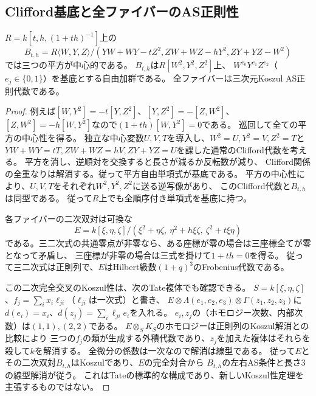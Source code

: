 \subsection{Clifford基底と全ファイバーのAS正則性}
\begin{lemma}\label{lem:ternary-clifford}
$R=k[t,h,(1+th)^{-1}]$上の
\[
 B_{t,h}=R\langle W,Y,Z\rangle/(YW+WY-tZ^2,ZW+WZ-hY^2,ZY+YZ-W^2)
\]
では三つの平方が中心的である。
$B_{t,h}$は$R[W^2,Y^2,Z^2]$上、
$W^{e_0}Y^{e_1}Z^{e_2}$（$e_j\in\{0,1\}$）を基底とする自由加群である。
全ファイバーは三次元Koszul AS正則代数である。
\end{lemma}
\begin{proof}
例えば$[W,Y^2]=-t[Y,Z^2]$、$[Y,Z^2]=-[Z,W^2]$、
$[Z,W^2]=-h[W,Y^2]$なので$(1+th)[W,Y^2]=0$である。
巡回して全ての平方の中心性を得る。
独立な中心変数$U,V,T$を導入し、$W^2=U,Y^2=V,Z^2=T$と
$YW+WY=tT,ZW+WZ=hV,ZY+YZ=U$を課した通常のClifford代数を考える。
平方を消し、逆順対を交換すると長さが減るか反転数が減り、
Clifford関係の全重なりは解消する。従って平方自由単項式が基底である。
平方の中心性により、$U,V,T$をそれぞれ$W^2,Y^2,Z^2$に送る逆写像があり、
このClifford代数と$B_{t,h}$は同型である。
従って$R$上でも全順序付き単項式を基底に持つ。

各ファイバーの二次双対は可換な
\begin{equation}\label{eq:ternary-dual}
 E=k[\xi,\eta,\zeta]/
 (\xi^2+\eta\zeta,\ \eta^2+h\xi\zeta,\ \zeta^2+t\xi\eta)
\end{equation}
である。三二次式の共通零点が非零なら、ある座標が零の場合は三座標全てが零となって矛盾し、
三座標が非零の場合は三式を掛けて$1+th=0$を得る。
従って三二次式は正則列で、$E$はHilbert級数$(1+q)^3$のFrobenius代数である。

この二次完全交叉のKoszul性は、次のTate複体でも確認できる。
$S=k[\xi,\eta,\zeta]$、$f_j=\sum_i x_i\ell_{ji}$（$\ell_{ji}$は一次式）と書き、
$E\otimes\Lambda(e_1,e_2,e_3)\otimes\Gamma(z_1,z_2,z_3)$に
$d(e_i)=x_i$、$d(z_j)=\sum_i\ell_{ji}e_i$を入れる。
$e_i,z_j$の（ホモロジー次数、内部次数）は$(1,1),(2,2)$である。
$E\otimes_S K_S$のホモロジーは正則列のKoszul解消との比較により
三つの$f_j$の類が生成する外積代数であり、$z_j$を加えた複体はそれらを殺して$k$を解消する。
全微分の係数は一次なので解消は線型である。
従って$E$とその二次双対$B_{t,h}$はKoszulであり、$E$の完全対合から
$B_{t,h}$の左右AS条件と長さ3の線型解消が従う。
これはTateの標準的な構成であり、新しいKoszul性定理を主張するものではない。
\end{proof}

